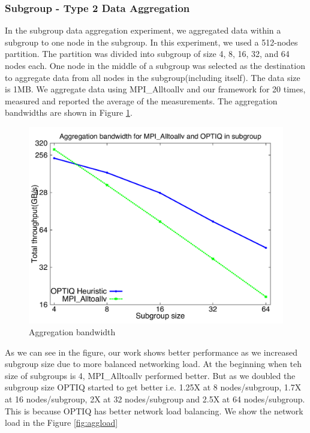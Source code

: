 \subsubsection{Subgroup - Type 2 Data Aggregation}

In the subgroup data aggregation experiment, we aggregated data within a subgroup to one node in the subgroup. In this experiment, we used a 512-nodes partition. The partition was divided into subgroup of size 4, 8, 16, 32, and 64 nodes each. One node in the middle of a subgroup was selected as the destination to aggregate data from all nodes in the subgroup(including itself). The data size is 1MB. We aggregate data using MPI\_Alltoallv and our framework for 20 times, measured and reported the average of the measurements. The aggregation bandwidths are shown in Figure \ref{fig:aggbw}.

\begin{figure}[!htb]
\vspace{-0.1in}
\centering
\includegraphics[scale=0.30]{figures/agg.pdf}
\vspace{-0.1in}
\caption{Aggregation bandwidth}
\vspace{-0.1in}
\label{fig:aggbw}
\end{figure}

As we can see in the figure, our work shows better performance as we increased subgroup size due to more balanced networking load. At the beginning when teh size of subgroups is 4, MPI\_Alltoallv performed better. But as we doubled the subgroup size OPTIQ started to get better i.e. 1.25X at 8 nodes/subgroup, 1.7X at 16 nodes/subgroup, 2X at 32 nodes/subgroup and 2.5X at 64 nodes/subgroup. This is because OPTIQ has better network load balancing. We show the network load in the Figure \ref{fig:aggload}

